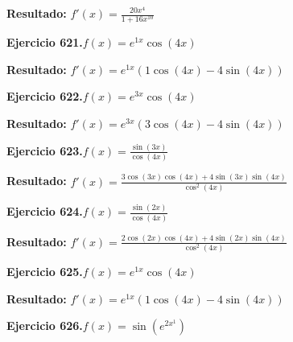 \documentclass[10pt,a4paper]{article}
\begin{document}
\begin{solbox}
\textbf{Resultado:} \(\displaystyle f'(x) = \frac{20x^{4}}{1+16x^{10}}\)
\end{solbox}

\begin{ejbox}
\textbf{Ejercicio 621.}\quad $f(x) = e^{1x} \cos(4x)$
\end{ejbox}

\begin{solbox}
\textbf{Resultado:} \(\displaystyle f'(x) = e^{1x}(1\cos(4x) - 4\sin(4x))\)
\end{solbox}

\newpage
\begin{ejbox}
\textbf{Ejercicio 622.}\quad $f(x) = e^{3x} \cos(4x)$
\end{ejbox}

\begin{solbox}
\textbf{Resultado:} \(\displaystyle f'(x) = e^{3x}(3\cos(4x) - 4\sin(4x))\)
\end{solbox}

\begin{ejbox}
\textbf{Ejercicio 623.}\quad $f(x) = \frac{\sin(3x)}{\cos(4x)}$
\end{ejbox}

\begin{solbox}
\textbf{Resultado:} \(\displaystyle f'(x) = \frac{3\cos(3x)\cos(4x) + 4\sin(3x)\sin(4x)}{\cos^2(4x)}\)
\end{solbox}

\begin{ejbox}
\textbf{Ejercicio 624.}\quad $f(x) = \frac{\sin(2x)}{\cos(4x)}$
\end{ejbox}

\begin{solbox}
\textbf{Resultado:} \(\displaystyle f'(x) = \frac{2\cos(2x)\cos(4x) + 4\sin(2x)\sin(4x)}{\cos^2(4x)}\)
\end{solbox}

\newpage
\begin{ejbox}
\textbf{Ejercicio 625.}\quad $f(x) = e^{1x} \cos(4x)$
\end{ejbox}

\begin{solbox}
\textbf{Resultado:} \(\displaystyle f'(x) = e^{1x}(1\cos(4x) - 4\sin(4x))\)
\end{solbox}

\begin{ejbox}
\textbf{Ejercicio 626.}\quad $f(x) = \sin(e^{2x^{1}})$
\end{ejbox}
\end{document}
